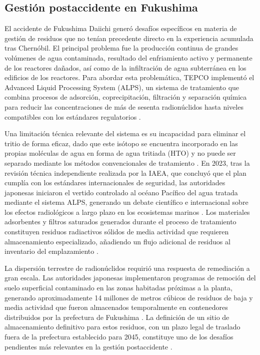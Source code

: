 \subsection{Gestión postaccidente en Fukushima}

El accidente de Fukushima Daiichi generó desafíos específicos en materia de
gestión de residuos que no tenían precedente directo en la experiencia acumulada
tras Chernóbil. El principal problema fue la producción continua de grandes
volúmenes de agua contaminada, resultado del enfriamiento activo y permanente de
los reactores dañados, así como de la infiltración de agua subterránea en los
edificios de los reactores. Para abordar esta problemática, TEPCO implementó el
Advanced Liquid Processing System (ALPS), un sistema de tratamiento que combina
procesos de adsorción, coprecipitación, filtración y separación química para
reducir las concentraciones de más de sesenta radionúclidos hasta niveles
compatibles con los estándares regulatorios \cite{IAEAALPS2025}.

Una limitación técnica relevante del sistema es su incapacidad para eliminar el
tritio de forma eficaz, dado que este isótopo se encuentra incorporado en las
propias moléculas de agua en forma de agua tritiada (HTO) y no puede ser separado
mediante los métodos convencionales de tratamiento \cite{IAEAALPS2025}. En 2023,
tras la revisión técnica independiente realizada por la IAEA, que concluyó que el
plan cumplía con los estándares internacionales de seguridad, las autoridades
japonesas iniciaron el vertido controlado al océano Pacífico del agua tratada
mediante el sistema ALPS, generando un debate científico e internacional sobre
los efectos radiológicos a largo plazo en los ecosistemas marinos \cite{IAEA2023water}.
Los materiales adsorbentes y filtros saturados generados durante el proceso de
tratamiento constituyen residuos radiactivos sólidos de media actividad que
requieren almacenamiento especializado, añadiendo un flujo adicional de residuos
al inventario del emplazamiento \cite{IAEAALPS2025}.

La dispersión terrestre de radionúclidos requirió una respuesta de remediación
a gran escala. Las autoridades japonesas implementaron programas de remoción del
suelo superficial contaminado en las zonas habitadas próximas a la planta,
generando aproximadamente 14 millones de metros cúbicos de residuos de baja y
media actividad que fueron almacenados temporalmente en contenedores distribuidos
por la prefectura de Fukushima \cite{MOE2021}. La definición de un sitio de
almacenamiento definitivo para estos residuos, con un plazo legal de traslado
fuera de la prefectura establecido para 2045, constituye uno de los desafíos
pendientes más relevantes en la gestión postaccidente \cite{MOE2021}.

